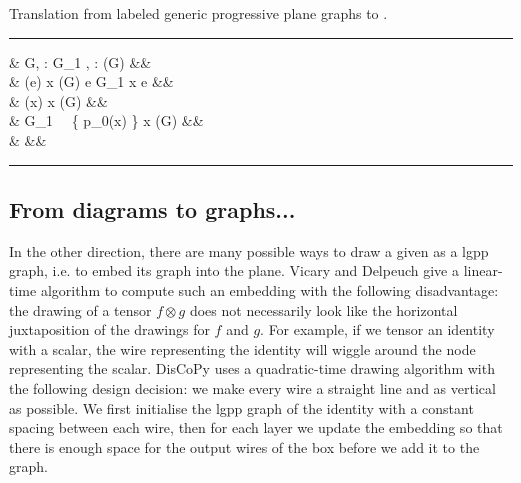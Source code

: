 \begin{python}\label{listing:lgpp2diagram}
{\normalfont Translation from labeled generic progressive plane graphs to .}
\vspace{5pt}
\hrule
\vspace{-15pt}
\begin{flalign*}
 \s &  \s G, \s \lambda : G_1 \to {}, \s \lambda : \boxes(G) \to {} \s {}&&\\
& \py{dom = [} \s \lambda(e) \s {} \s x \in \dom(G) \s {} \s e \in G_1 \s {} \s x \in \partial e \s \py{]}&&\\
& \py{boxes = [} \s \lambda(x) \s {} \s x \in \boxes(G) \s \py{]}&&\\
& \py{offsets = [len(} \s G_1 \ \cap \ \{ p_0(x) \} \times \R \s {} \s x \in \boxes(G) \s \py{]}&&\\
&  &&
\vspace{-10pt}
\end{flalign*}
\hrule
\end{python}

\subsection{From diagrams to graphs...}

In the other direction, there are many possible ways to draw a given  as a lgpp graph, i.e. to embed its graph into the plane.
Vicary and Delpeuch \cite{DelpeuchVicary18} give a linear-time algorithm to compute such an embedding with the following disadvantage: the drawing of a tensor $f \otimes g$ does not necessarily look like the horizontal juxtaposition of the drawings for $f$ and $g$.
For example, if we tensor an identity with a scalar, the wire representing the identity will wiggle around the node representing the scalar.
DisCoPy uses a quadratic-time drawing algorithm with the following design decision: we make every wire a straight line and as vertical as possible.
We first initialise the lgpp graph of the identity with a constant spacing between each wire, then for each layer we update the embedding so that there is enough space for the output wires of the box before we add it to the graph.

